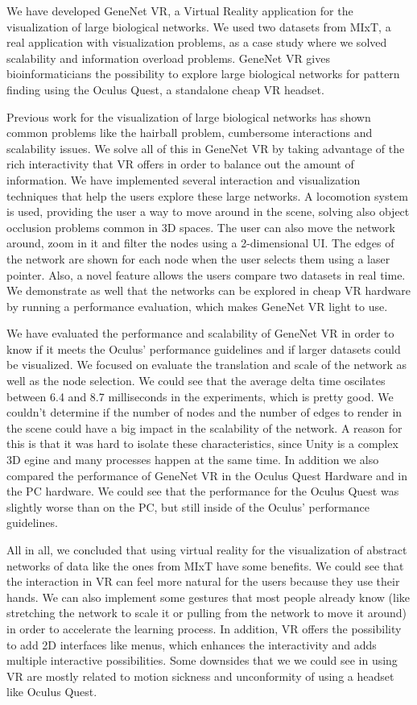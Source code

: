 We have developed GeneNet VR, a Virtual Reality application for the visualization of large biological networks. We used two datasets from MIxT, a real application with visualization problems, as a case study where we solved scalability and information overload problems. GeneNet VR gives bioinformaticians the possibility to explore large biological networks for pattern finding using the Oculus Quest, a standalone cheap VR headset.

Previous work for the visualization of large biological networks has shown common problems like the hairball problem, cumbersome interactions and scalability issues. We solve all of this in GeneNet VR by taking advantage of the rich interactivity that VR offers in order to balance out the amount of information. We have implemented several interaction and visualization techniques that help the users explore these large networks. A locomotion system is used, providing the user a way to move around in the scene, solving also object occlusion problems common in 3D spaces. The user can also move the network around, zoom in it and filter the nodes using a 2-dimensional UI. The edges of the network are shown for each node when the user selects them using a laser pointer. Also, a novel feature allows the users compare two datasets in real time. We demonstrate as well that the networks can be explored in cheap VR hardware by running a performance evaluation, which makes GeneNet VR light to use.

We have evaluated the performance and scalability of GeneNet VR in order to know if it meets the Oculus' performance guidelines and if larger datasets could be visualized. We focused on evaluate the translation and scale of the network as well as the node selection.  We could see that the average delta time oscilates between 6.4 and 8.7 milliseconds in the experiments, which is pretty good. We couldn't determine if the number of nodes and the number of edges to render in the scene could have a big impact in the scalability of the network. A reason for this is that it was hard to isolate these characteristics, since Unity is a complex 3D egine and many processes happen at the same time. In addition we also compared the performance of GeneNet VR in the Oculus Quest Hardware and in the PC hardware. We could see that the performance for the Oculus Quest was slightly worse than on the PC, but still inside of the Oculus' performance guidelines.

All in all, we concluded that using virtual reality for the visualization of abstract networks of data like the ones from MIxT have some benefits. We could see that the interaction in VR can feel more natural for the users because they use their hands. We can also implement some gestures that most people already know (like stretching the network to scale it or pulling from the network to move it around) in order to accelerate the learning process. In addition, VR offers the possibility to add 2D interfaces like menus, which enhances the interactivity and adds multiple interactive possibilities. Some downsides that we we could see in using VR are mostly related to motion sickness and unconformity of using a headset like Oculus Quest.
